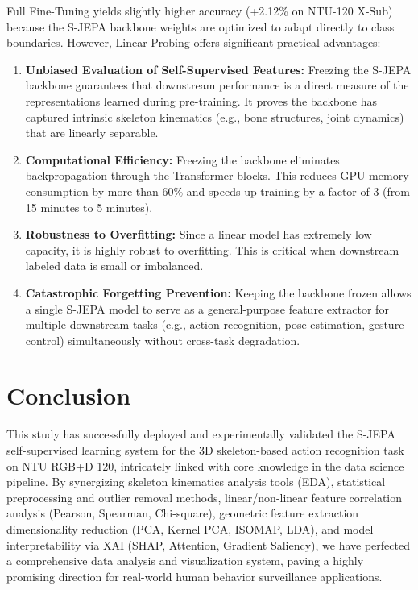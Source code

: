 \documentclass[conference]{IEEEtran}
\begin{document}
Full Fine-Tuning yields slightly higher accuracy (+2.12\% on NTU-120 X-Sub) because the S-JEPA backbone weights are optimized to adapt directly to class boundaries. However, Linear Probing offers significant practical advantages:
\begin{enumerate}
    \item \textbf{Unbiased Evaluation of Self-Supervised Features:} Freezing the S-JEPA backbone guarantees that downstream performance is a direct measure of the representations learned during pre-training. It proves the backbone has captured intrinsic skeleton kinematics (e.g., bone structures, joint dynamics) that are linearly separable.
    \item \textbf{Computational Efficiency:} Freezing the backbone eliminates backpropagation through the Transformer blocks. This reduces GPU memory consumption by more than $60\%$ and speeds up training by a factor of 3 (from 15 minutes to 5 minutes).
    \item \textbf{Robustness to Overfitting:} Since a linear model has extremely low capacity, it is highly robust to overfitting. This is critical when downstream labeled data is small or imbalanced.
    \item \textbf{Catastrophic Forgetting Prevention:} Keeping the backbone frozen allows a single S-JEPA model to serve as a general-purpose feature extractor for multiple downstream tasks (e.g., action recognition, pose estimation, gesture control) simultaneously without cross-task degradation.
\end{enumerate}

\balance
\section{Conclusion}
This study has successfully deployed and experimentally validated the S-JEPA self-supervised learning system for the 3D skeleton-based action recognition task on NTU RGB+D 120, intricately linked with core knowledge in the data science pipeline. By synergizing skeleton kinematics analysis tools (EDA), statistical preprocessing and outlier removal methods, linear/non-linear feature correlation analysis (Pearson, Spearman, Chi-square), geometric feature extraction dimensionality reduction (PCA, Kernel PCA, ISOMAP, LDA), and model interpretability via XAI (SHAP, Attention, Gradient Saliency), we have perfected a comprehensive data analysis and visualization system, paving a highly promising direction for real-world human behavior surveillance applications.
\end{document}
